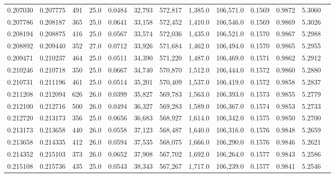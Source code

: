 \begin{tabular}{rrrrrrrrrrrrr}
0.207030 & 0.207775 &   491 & 25.0 &                                     0.0484 &  32,793 & 572,817 &   1,385.0 & 106,571.0 & 0.1569 & 0.9872 & 5.3060 \\
0.207786 & 0.208187 &   365 & 25.0 &                                     0.0641 &  33,158 & 572,452 &   1,410.0 & 106,546.0 & 0.1569 & 0.9869 & 5.3026 \\
0.208194 & 0.208875 &   416 & 25.0 &                                     0.0567 &  33,574 & 572,036 &   1,435.0 & 106,521.0 & 0.1570 & 0.9867 & 5.2988 \\
0.208892 & 0.209440 &   352 & 27.0 &                                     0.0712 &  33,926 & 571,684 &   1,462.0 & 106,494.0 & 0.1570 & 0.9865 & 5.2955 \\
0.209471 & 0.210237 &   464 & 25.0 &                                     0.0511 &  34,390 & 571,220 &   1,487.0 & 106,469.0 & 0.1571 & 0.9862 & 5.2912 \\
0.210246 & 0.210718 &   350 & 25.0 &                                     0.0667 &  34,740 & 570,870 &   1,512.0 & 106,444.0 & 0.1572 & 0.9860 & 5.2880 \\
0.210731 & 0.211196 &   461 & 25.0 &                                     0.0514 &  35,201 & 570,409 &   1,537.0 & 106,419.0 & 0.1572 & 0.9858 & 5.2837 \\
0.211208 & 0.212094 &   626 & 26.0 &                                     0.0399 &  35,827 & 569,783 &   1,563.0 & 106,393.0 & 0.1573 & 0.9855 & 5.2779 \\
0.212100 & 0.212716 &   500 & 26.0 &                                     0.0494 &  36,327 & 569,283 &   1,589.0 & 106,367.0 & 0.1574 & 0.9853 & 5.2733 \\
0.212720 & 0.213173 &   356 & 25.0 &                                     0.0656 &  36,683 & 568,927 &   1,614.0 & 106,342.0 & 0.1575 & 0.9850 & 5.2700 \\
0.213173 & 0.213658 &   440 & 26.0 &                                     0.0558 &  37,123 & 568,487 &   1,640.0 & 106,316.0 & 0.1576 & 0.9848 & 5.2659 \\
0.213658 & 0.214335 &   412 & 26.0 &                                     0.0594 &  37,535 & 568,075 &   1,666.0 & 106,290.0 & 0.1576 & 0.9846 & 5.2621 \\
0.214352 & 0.215103 &   373 & 26.0 &                                     0.0652 &  37,908 & 567,702 &   1,692.0 & 106,264.0 & 0.1577 & 0.9843 & 5.2586 \\
0.215108 & 0.215736 &   435 & 25.0 &                                     0.0543 &  38,343 & 567,267 &   1,717.0 & 106,239.0 & 0.1577 & 0.9841 & 5.2546 \\

\end{tabular}
